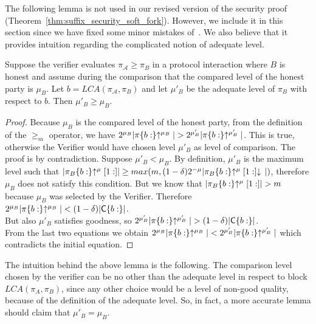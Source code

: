 The following lemma is not used  in our revised version of the security proof (Theorem~\ref{thm:suffix_security_soft_fork}). However, we include it in this section since we have fixed some minor mistakes of~\cite{nipopows}. We also believe that it provides intuition regarding the complicated notion of adequate level.
\begin{lemma}
	Suppose the verifier evaluates $\pi_\mathcal{A} \geq \pi_B$ in a
	protocol interaction where $B$ is honest and assume during the comparison that the
	compared level of the honest party is $\mu_B$. Let $b = LCA(\pi_\mathcal{A}, \pi_B)$ and
	let ${\mu}'_B$ be the adequate level of $\pi_B$ with respect to $b$. Then ${\mu}'_B
	\geq \mu_B$.
	\label{lemm:greatest_adequate}
\end{lemma}
\begin{proof}
	Because $\mu_B$ is the compared level of the honest party, from
	the definition of the $\geq_m$ operator, we have $2^{\mu_B} \vert \pi\{b:\}\negthickspace\uparrow^{\mu_B}
	\vert > 2^{{\mu}'_B} \vert \pi\{b:\}\negthickspace\uparrow^{{\mu}'_B} \vert $. This is true,
	otherwise the Verifier would have chosen level $\mu'_B$ as level of comparison.
	The proof is by contradiction. Suppose $\mu'_B < \mu_B$.
	By definition, $\mu'_B$ is the maximum level such that $\vert \pi_B\{b:\}\negthickspace\uparrow^\mu
	[1:] \vert \geq max(m, (1-\delta)2^{-\mu}\vert \pi_B\{b:\}\negthickspace\uparrow^\mu [1:]\negthickspace\downarrow\,
	\vert)$, therefore $\mu_B$ does not satisfy this condition.
	But we know that $\vert \pi_B\{b:\}\negthickspace\uparrow^\mu [1:] \vert > m$ because
	$\mu_B$ was selected by the Verifier.
	Therefore $ 2^{\mu_B} \vert \pi\{b:\}\negthickspace\uparrow^{\mu_B} \vert < (1-\delta)\vert
	\mathsf{C}\{b:\}\vert $. \\
	But also $\mu'_B$ satisfies goodness, so $ 2^{\mu'_B} \vert \pi\{b:\}\negthickspace\uparrow^{\mu'_B}
	\vert > (1-\delta)\vert \mathsf{C}\{b:\}\vert $.\\ From the last two equations we obtain
	$ 2^{\mu_B} \vert \pi\{b:\}\negthickspace\uparrow^{\mu_B} \vert < 2^{\mu'_B} \vert
	\pi\{b:\}\negthickspace\uparrow^{\mu'_B} \vert$ which contradicts the initial equation.
\end{proof}

The intuition behind the above lemma is the following. The comparison level chosen by the verifier can be
no other than the adequate level in respect to block $LCA(\pi_A, \pi_B)$, since
any other choice would be a level of non-good quality, because of the definition of
the adequate level. 
So, in fact, a more accurate lemma should claim that $\mu'_B = \mu_B$. 

